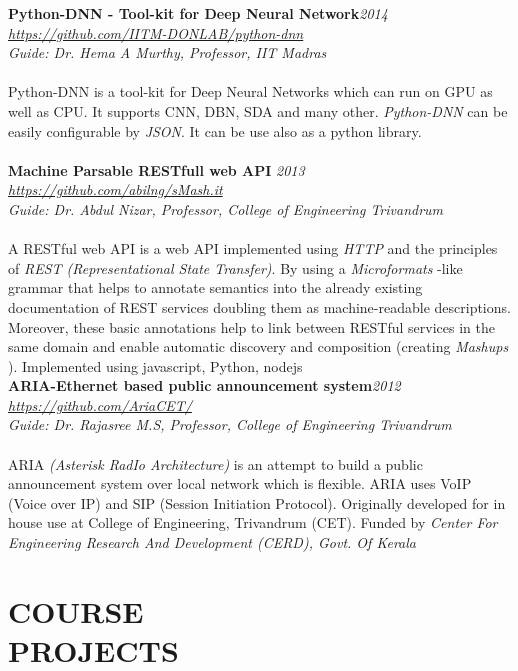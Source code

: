 \documentclass[line, margin]{res}
\begin{document}
\begin{resume}
  \textbf{Python-DNN - Tool-kit for Deep Neural Network}\hfill \textit{2014}\\
  \textit{\url{https://github.com/IITM-DONLAB/python-dnn}}\\
  \textit{Guide: Dr. Hema A Murthy, Professor, IIT Madras}\\\\
  Python-DNN is a tool-kit for Deep Neural Networks which can run on GPU as well as CPU. It supports CNN, DBN, SDA and many other. \textit{Python-DNN} can be easily configurable by \textit{JSON}. It can be use also as a python library.\\\\

  \textbf{Machine Parsable RESTfull web API }\hfill \textit{2013}\\
  \textit{\url{https://github.com/abilng/sMash.it}}\\
  \textit{Guide: Dr. Abdul Nizar, Professor, College of Engineering Trivandrum}\\\\
  A RESTful web API is a web API implemented using \textit{HTTP }and the principles of \textit{REST (Representational State Transfer)}. By using  a \textit{Microformats }-like grammar that helps to annotate semantics into the already existing documentation of REST services doubling them as machine-readable descriptions. Moreover, these basic annotations help to link between RESTful services in the same domain and enable automatic discovery and composition (creating \textit{Mashups }). Implemented using javascript, Python, nodejs\\

  \textbf{ARIA-Ethernet based public announcement system}\hfill \textit{2012}\\
  \textit{\url{https://github.com/AriaCET/}}\\
  \textit{Guide: Dr. Rajasree M.S, Professor, College of Engineering Trivandrum}\\\\
  ARIA \textit{(Asterisk RadIo Architecture)} is an attempt to build a public announcement system over local network which is flexible. ARIA uses VoIP (Voice over IP) and SIP (Session Initiation Protocol). Originally developed for in house use at College of Engineering, Trivandrum (CET). Funded by \textit{Center For Engineering Research And Development (CERD), Govt. Of Kerala}\\


  \section{COURSE \\ PROJECTS}


\end{resume}
\end{document}
